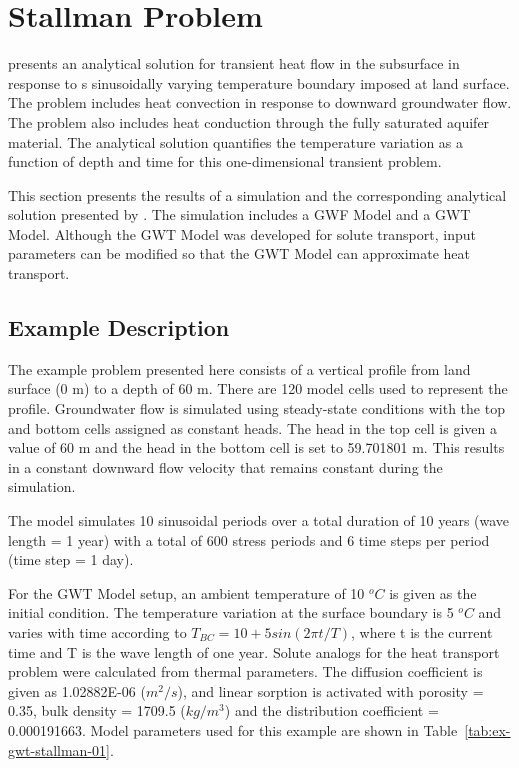 \section{Stallman Problem}

\cite{stallman1965steady} presents an analytical solution for transient heat flow in the subsurface in response to s sinusoidally varying temperature boundary imposed at land surface.  The problem includes heat convection in response to downward groundwater flow.  The problem also includes heat conduction through the fully saturated aquifer material.  The analytical solution quantifies the  temperature variation as a function of depth and time for this one-dimensional transient problem.

This section presents the results of a \mf simulation and the corresponding analytical solution presented by \cite{stallman1965steady}.  The \mf simulation includes a GWF Model and a GWT Model.  Although the GWT Model was developed for solute transport, input parameters can be modified so that the GWT Model can approximate heat transport.

\subsection{Example Description}

The example problem presented here consists of a vertical profile from land surface (0 m) to a depth of 60 m.  There are 120 model cells used to represent the profile.  Groundwater flow is simulated using steady-state conditions with the top and bottom cells assigned as constant heads.  The head in the top cell is given a value of 60 m and the head in the bottom cell is set to 59.701801 m.  This results in a constant downward flow velocity that remains constant during the simulation.

The model simulates 10 sinusoidal periods over a total duration of 10 years (wave length = 1 year) with a total of 600 stress periods and 6 time steps per period (time step = 1 day).

 For the GWT Model setup, an ambient temperature of 10 $^o C$ is given as the initial condition. The temperature variation at the surface boundary is 5 $^o C$ and varies with time according to
 $T_{BC} = 10+5sin(2\pi t/T)$, where t is the current time and T is the wave length of one year.
Solute analogs for the heat transport problem were calculated from thermal parameters.  The diffusion coefficient is given as 1.02882E-06 ($m^2/s$), and linear sorption is activated with porosity = 0.35, bulk density = 1709.5 ($kg/m^3$) and the distribution coefficient = 0.000191663.  
Model parameters used for this example are shown in Table~\ref{tab:ex-gwt-stallman-01}.

